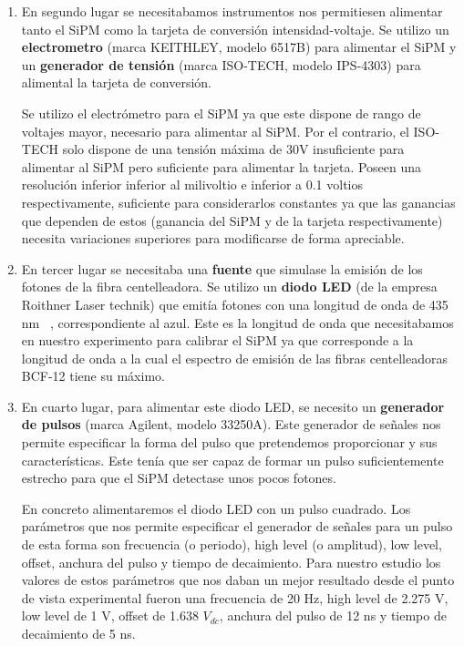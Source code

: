 \begin{enumerate}
\item {} En segundo lugar se necesitabamos instrumentos nos permitiesen alimentar tanto el SiPM como la tarjeta de conversión intensidad-voltaje. Se utilizo  un \textbf{electrometro} (marca KEITHLEY, modelo 6517B) para alimentar el SiPM y un \textbf{generador de tensión} (marca ISO-TECH, modelo IPS-4303) para alimental la tarjeta de conversión.

Se utilizo el electrómetro para el SiPM ya que este dispone de rango de voltajes mayor, necesario para alimentar al SiPM. Por el contrario, el ISO-TECH solo dispone de una tensión máxima de 30V insuficiente para alimentar al SiPM pero suficiente para alimentar la tarjeta. Poseen una resolución inferior inferior al milivoltio e inferior a 0.1 voltios respectivamente, suficiente para considerarlos constantes ya que las ganancias que dependen de estos (ganancia del SiPM y de la tarjeta respectivamente) necesita variaciones superiores para modificarse de forma apreciable.

\item {} En tercer lugar se necesitaba una \textbf{fuente} que simulase la emisión de los fotones de la fibra centelleadora. 
\newline
Se utilizo un \textbf{diodo LED} (de la empresa Roithner Laser technik) que emitía fotones con una longitud de onda de 435 nm ~\cite{datasheetLED}, correspondiente al azul. Este es la longitud de onda que necesitabamos en nuestro experimento para calibrar el SiPM ya que corresponde a la longitud de onda a la cual el espectro de emisión de las fibras centelleadoras BCF-12 tiene su máximo.

\item {} En cuarto lugar, para alimentar este diodo LED, se necesito un \textbf{generador de pulsos} (marca Agilent, modelo 33250A). Este generador de señales nos permite especificar la forma del pulso que pretendemos proporcionar y sus características. Este tenía que ser capaz de formar un pulso suficientemente estrecho para que el SiPM detectase unos pocos fotones. 

En concreto alimentaremos el diodo LED con un pulso cuadrado. Los parámetros que nos permite especificar el generador de señales para un pulso de esta forma son frecuencia (o periodo), high level (o amplitud), low level, offset, anchura del pulso y tiempo de decaimiento. Para nuestro estudio los valores de estos parámetros que nos daban un mejor resultado desde el punto de vista experimental fueron una frecuencia de 20 Hz, high level de 2.275 V, low level de 1 V, offset de 1.638 $V_{dc}$, anchura del pulso de 12 ns y tiempo de decaimiento de 5 ns.


\end{enumerate}
